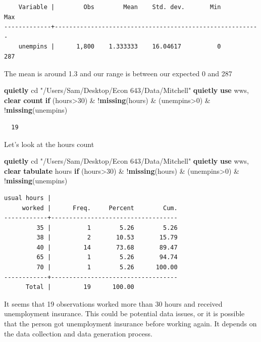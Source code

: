\documentclass[
]{book}
\newenvironment{Shaded}{\begin{snugshade}}{\end{snugshade}}
\newcommand{\FunctionTok}[1]{\textcolor[rgb]{0.13,0.29,0.53}{\textbf{#1}}}
\newcommand{\KeywordTok}[1]{\textcolor[rgb]{0.13,0.29,0.53}{\textbf{#1}}}
\newcommand{\NormalTok}[1]{#1}
\newcommand{\StringTok}[1]{\textcolor[rgb]{0.31,0.60,0.02}{#1}}
\begin{document}
\begin{verbatim}
    Variable |        Obs        Mean    Std. dev.       Min        Max
-------------+---------------------------------------------------------
    unempins |      1,800    1.333333    16.04617          0        287
\end{verbatim}

The mean is around 1.3 and our range is between our expected 0 and 287

\begin{Shaded}
\begin{Highlighting}[]
\KeywordTok{quietly}\NormalTok{ cd }\StringTok{"/Users/Sam/Desktop/Econ 643/Data/Mitchell"}
\KeywordTok{quietly} \KeywordTok{use}\NormalTok{ wws, }\KeywordTok{clear}
\FunctionTok{count} \KeywordTok{if}\NormalTok{ (hours\textgreater{}30) \& !}\FunctionTok{missing}\NormalTok{(hours) \& (unempins\textgreater{}0) \& !}\FunctionTok{missing}\NormalTok{(unempins)}
\end{Highlighting}
\end{Shaded}

\begin{verbatim}
  19
\end{verbatim}

Let's look at the hours count

\begin{Shaded}
\begin{Highlighting}[]
\KeywordTok{quietly}\NormalTok{ cd }\StringTok{"/Users/Sam/Desktop/Econ 643/Data/Mitchell"}
\KeywordTok{quietly} \KeywordTok{use}\NormalTok{ wws, }\KeywordTok{clear}
\KeywordTok{tabulate}\NormalTok{ hours }\KeywordTok{if}\NormalTok{ (hours\textgreater{}30) \& !}\FunctionTok{missing}\NormalTok{(hours) \& (unempins\textgreater{}0) \& !}\FunctionTok{missing}\NormalTok{(unempins)}
\end{Highlighting}
\end{Shaded}

\begin{verbatim}
usual hours |
     worked |      Freq.     Percent        Cum.
------------+-----------------------------------
         35 |          1        5.26        5.26
         38 |          2       10.53       15.79
         40 |         14       73.68       89.47
         65 |          1        5.26       94.74
         70 |          1        5.26      100.00
------------+-----------------------------------
      Total |         19      100.00
\end{verbatim}

It seems that 19 observations worked more than 30 hours and received unemployment insurance. This could be potential data issues, or it is possible that the person got unemployment insurance before working again. It depends on the data collection and data generation process.
\end{document}
